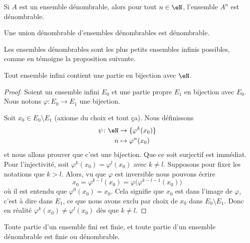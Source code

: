 \begin{proposition}     \label{PROPooDMZHooXouDrQ}
    Si \( A\) est un ensemble dénombrable, alors pour tout \( n\in \eN\), l'ensemble \( A^n\) est dénombrable.
\end{proposition}

\begin{proposition}     \label{PROPooENTPooSPpmhY}
    Une union dénombrable d'ensembles dénombrables est dénombrable.
\end{proposition}


Les ensembles dénombrables sont les plus petits ensembles infinis possibles, comme en témoigne la proposition suivante.
\begin{proposition}      \label{PROPooUIPAooCUEFme}
    Tout ensemble infini contient une partie en bijection avec \( \eN\).
\end{proposition}

\begin{proof}
    Soient un ensemble infini \( E_0\) et une partie propre \( E_1\) en bijection avec \( E_0\). Nous notons \( \varphi\colon E_0\to E_1\) une bijection.

    Soit \( x_0\in E_0\setminus E_1\) (axiome du choix et tout ça). Nous définissons
    \begin{equation}
        \begin{aligned}
            \psi\colon \eN&\to \{\varphi^k(x_0)\} \\
            n&\mapsto \varphi^n(x_0)
        \end{aligned}
    \end{equation}
    et nous allons prouver que c'est une bijection. Que ce soit surjectif est immédiat. Pour l'injectivité, soit \( \varphi^k(x_0)=\varphi^l(x_0)\) avec \( k\neq l\). Supposons pour fixer les notations que \( k>l\). Alors, vu que \( \varphi\) est inversible nous pouvons écrire
    \begin{equation}
        x_0=\varphi^{k-l}(x_0)=\varphi\big( \varphi^{k-l-1}(x_0) \big)
    \end{equation}
    où il est entendu que \( \varphi^0(x_0)=x_0\). Cela signifie que \( x_0\) est dans l'image de \( \varphi\), c'est à dire dans $E_1$, ce que nous avons exclu par choix de \( x_0\) dans \( E_0\setminus E_1\). Donc en réalité \( \varphi^k(x_0)\neq \varphi^l(x_0)\) dès que \( k\neq l\).
\end{proof}

\begin{proposition} \label{PropQEPoozLqOQ}
    Toute partie d'un ensemble fini est finie, et toute partie d'un ensemble dénombrable est finie ou dénombrable.
\end{proposition}

